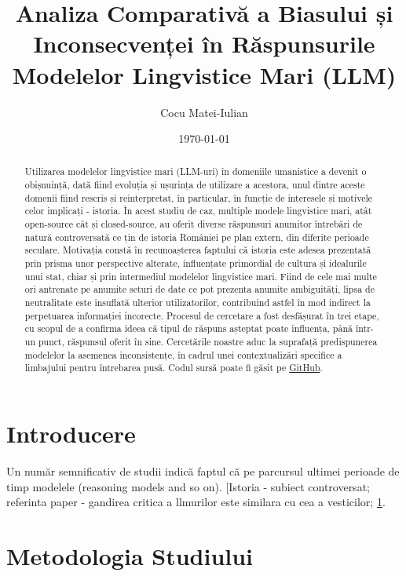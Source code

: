 \documentclass[a4paper, 10pt, twocolumn]{article}
\title{\Huge Analiza Comparativă a Biasului și Inconsecvenței în Răspunsurile Modelelor Lingvistice Mari (LLM)}
\author[1]{}
\author[2]{}
\author[2]{Cocu Matei-Iulian}
\affil[1]{Facultatea de Matematică și Informatică, Universitatea din București}
\affil[ ]{\textit{\{,\}@s.unibuc.ro, }}
\date{\today}
\begin{document}
\maketitle

\begin{abstract}
Utilizarea modelelor lingvistice mari (LLM-uri) în domeniile umanistice a devenit o obișnuință, dată fiind evoluția și ușurința de utilizare a acestora, unul dintre aceste domenii fiind rescris și reinterpretat, în particular, în funcție de interesele și motivele celor implicați - istoria. În acest studiu de caz, multiple modele lingvistice mari, atât open-source cât și closed-source, au oferit diverse răspunsuri anumitor întrebări de natură controversată ce țin de istoria României pe plan extern, din diferite perioade seculare. Motivația constă în recunoașterea faptului că istoria este adesea prezentată prin prisma unor perspective alterate, influențate primordial de cultura și idealurile unui stat, chiar și prin intermediul modelelor lingvistice mari. Fiind de cele mai multe ori antrenate pe anumite seturi de date ce pot prezenta anumite ambiguități, lipsa de neutralitate este insuflată ulterior utilizatorilor, contribuind astfel în mod indirect la perpetuarea informației incorecte. Procesul de cercetare a fost desfășurat în trei etape, cu scopul de a confirma ideea că tipul de răspuns așteptat poate influența, până într-un punct, răspunsul oferit în sine. Cercetările noastre aduc la suprafață predispunerea modelelor la asemenea inconsistențe, în cadrul unei contextualizări specifice a limbajului pentru întrebarea pusă. Codul sursă poate fi găsit pe \href{https://github.com/mateipiratul/llm_studycase}{GitHub}.
\end{abstract}

\section{Introducere}
Un număr semnificativ de studii indică faptul că pe parcursul ultimei perioade de timp modelele (reasoning models and so on).
[Istoria - subiect controversat; referinta paper - gandirea critica a llmurilor este similara cu cea a vesticilor; 
\ref{fig:workflow}.

\begin{figure}[h!]
    \centering
    \caption{}
    \label{fig:workflow}
\end{figure}

\section{Metodologia Studiului}
\end{document}
